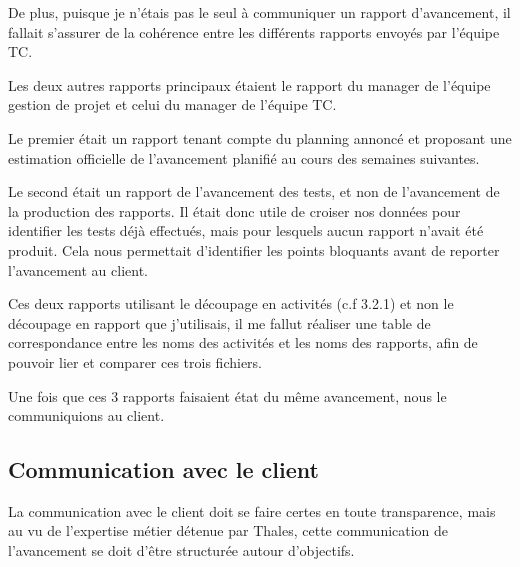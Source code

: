 De plus, puisque je n'étais pas le seul à communiquer un rapport d'avancement, il fallait s'assurer de la cohérence entre les différents rapports envoyés par l'équipe \gls{TC}.

Les deux autres rapports principaux étaient le rapport du manager de l'équipe gestion de projet et celui du manager de l'équipe \gls{TC}.

Le premier était un rapport tenant compte du planning annoncé et proposant une estimation officielle de l'avancement planifié au cours des semaines suivantes.

Le second était un rapport de l'avancement des tests, et non de l'avancement de la production des rapports. Il était donc utile de croiser nos données pour identifier les tests déjà effectués, mais pour lesquels aucun rapport n'avait été produit.
Cela nous permettait d'identifier les points bloquants avant de reporter l'avancement au client.

Ces deux rapports utilisant le découpage en activités (c.f 3.2.1) et non le découpage en rapport que j'utilisais, il me fallut réaliser une table de correspondance entre les noms des activités et les noms des rapports, afin de pouvoir lier et comparer ces trois fichiers.

Une fois que ces 3 rapports faisaient état du même avancement, nous le communiquions au client.


\subsection{Communication avec le client}

La communication avec le client doit se faire certes en toute transparence, mais au vu de l'expertise métier détenue par Thales, cette communication de l'avancement se doit d'être structurée autour d'objectifs.

